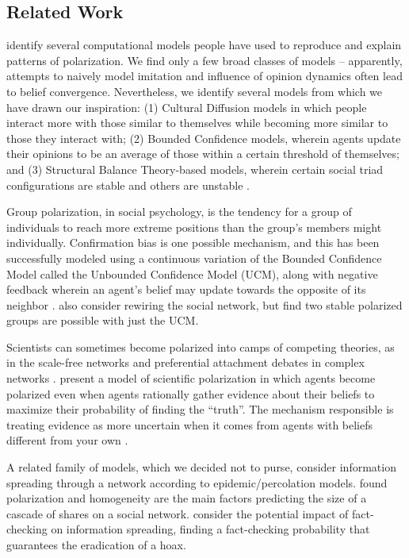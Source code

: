 \documentclass{article}
\begin{document}
\subsection{Related Work}

\citet{bramson2017} identify several computational models people have used to reproduce and explain patterns of polarization. We find only a few broad classes of models -- apparently, attempts to naively model imitation and influence of opinion dynamics often lead to belief convergence. Nevertheless, we identify several models from which we have drawn our inspiration: (1) Cultural Diffusion models in which people interact more with those similar to themselves while becoming more similar to those they interact with; (2) Bounded Confidence models, wherein agents update their opinions to be an average of those within a certain threshold of themselves; and (3) Structural Balance Theory-based models, wherein certain social triad configurations are stable and others are unstable \citep{bramson2017}. 

Group polarization, in social psychology, is the tendency for a group of individuals to reach more extreme positions than the group's members might individually. Confirmation bias is one possible mechanism, and this has been successfully modeled using a continuous variation of the Bounded Confidence Model called the Unbounded Confidence Model (UCM), along with negative feedback wherein an agent's belief may update towards the opposite of its neighbor \citep{confbias}. \citet{confbias} also consider rewiring the social network, but find two stable polarized groups are possible with just the UCM.

Scientists can sometimes become polarized into camps of competing theories, as in the scale-free networks and preferential attachment debates in complex networks \citep{scalefree}. \citet{oconnor2017} present a model of scientific polarization in which agents become polarized even when agents rationally gather evidence about their beliefs to maximize their probability of finding the ``truth''. The mechanism responsible is treating evidence as more uncertain when it comes from agents with beliefs different from your own \citep{oconnor2017}.

A related family of models, which we decided not to purse, consider information spreading through a network according to epidemic/percolation models. \citet{misinformation_spread} found polarization and homogeneity are the main factors predicting the size of a cascade of shares on a social network. \citet{hoax_spread} consider the potential impact of fact-checking on information spreading, finding a fact-checking probability that guarantees the eradication of a hoax.  
\end{document}
